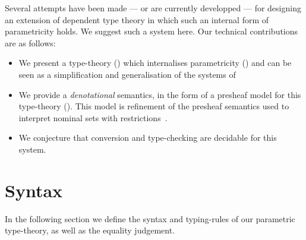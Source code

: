 \documentclass[english]{PaperTools/latex/lipics}
\begin{document}
Several attempts have been made
\citep{bernardy_computational_2012,bernardy_type-theory_2013} --- or are currently
developped \citep{altenkirch2014syntax} ---
for designing an extension of dependent type theory in which such an internal form of
parametricity holds. We suggest such a system here.
Our technical contributions are as follows:
\begin{itemize}
\item We present a type-theory () which internalises parametricity ()
  and can be seen as a simplification and generalisation of the systems of
  \cite{bernardy_computational_2012,bernardy_type-theory_2013}
\item We provide a \emph{denotational} semantics, in the form of a presheaf model for this type-theory ().
      This model is refinement of the presheaf semantics used to
      interpret nominal sets with
      restrictions~\citep{bezem2014model,DBLP:journals/corr/Pitts14}.
\item We conjecture that conversion and type-checking are decidable for this system.
\end{itemize}

\section{Syntax}
\label{sec:syntax}
In the following section we define the syntax and typing-rules of our
parametric type-theory, as well as the equality judgement.
\end{document}
